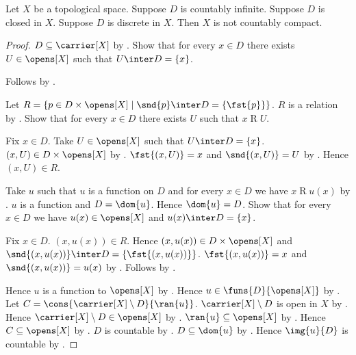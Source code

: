 \begin{theorem}\label{countably_infinite_closed_discrete_obstructs_countable_compactness}
    Let $X$ be a topological space.
    Suppose $D$ is countably infinite.
    Suppose $D$ is closed in $X$.
    Suppose $D$ is discrete in $X$.
    Then $X$ is not countably compact.
\end{theorem}
\begin{proof}
    $D\subseteq\carrier[X]$ by .
    Show that for every $x\in D$ there exists $U\in\opens[X]$ such that
        $U\inter D=\{x\}$.
    \begin{subproof}
        Follows by .
    \end{subproof}
    Let $R=\{p\in D\times\opens[X]\mid
        \text{$\snd{p}\inter D=\{\fst{p}\}$}\}$.
    $R$ is a relation by .
    Show that for every $x\in D$ there exists $U$ such that
        $x\mathrel{R}U$.
    \begin{subproof}
        Fix $x\in D$.
        Take $U\in\opens[X]$ such that $U\inter D=\{x\}$.
        $(x,U)\in D\times\opens[X]$ by .
        $\fst{(x,U)}=x$ and $\snd{(x,U)}=U$ by .
        Hence $(x,U)\in R$.
    \end{subproof}
    Take $u$ such that $u$ is a function on $D$ and
        for every $x\in D$ we have $x\mathrel{R}u(x)$
        by .
    $u$ is a function and $D=\dom{u}$.
    Hence $\dom{u}=D$.
    Show that for every $x\in D$ we have $u(x)\in\opens[X]$ and
        $u(x)\inter D=\{x\}$.
    \begin{subproof}
        Fix $x\in D$.
        $(x,u(x))\in R$.
        Hence $(x,u(x))\in D\times\opens[X]$ and
            $\snd{(x,u(x))}\inter D=\{\fst{(x,u(x))}\}$.
        $\fst{(x,u(x))}=x$ and $\snd{(x,u(x))}=u(x)$
            by .
        Follows by .
    \end{subproof}
    Hence $u$ is a function to $\opens[X]$ by \auto.
    Hence $u\in\funs{D}{\opens[X]}$ by .
    Let $C=\cons{\carrier[X]\setminus D}{\ran{u}}$.
    $\carrier[X]\setminus D$ is open in $X$
        by .
    Hence $\carrier[X]\setminus D\in\opens[X]$ by .
    $\ran{u}\subseteq\opens[X]$ by .
    Hence $C\subseteq\opens[X]$ by .
    $D$ is countable by .
    $D\subseteq\dom{u}$ by .
    Hence $\img{u}{D}$ is countable by .

\end{proof}
